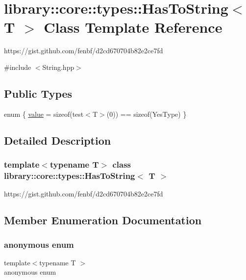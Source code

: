 \hypertarget{classlibrary_1_1core_1_1types_1_1_has_to_string}{}\section{library\+:\+:core\+:\+:types\+:\+:Has\+To\+String$<$ T $>$ Class Template Reference}
\label{classlibrary_1_1core_1_1types_1_1_has_to_string}


https\+://gist.github.\+com/fenbf/d2cd670704b82e2ce7fd  




{\ttfamily \#include $<$String.\+hpp$>$}

\subsection*{Public Types}
\begin{DoxyCompactItemize}
\item 
enum \{ \hyperlink{classlibrary_1_1core_1_1types_1_1_has_to_string_a66718ae4c4783afe3e8137ddbd6689afaec23beac9fd1e1c74d43c6242f649acc}{value} = sizeof(test$<$T$>$(0)) == sizeof(Yes\+Type)
 \}
\end{DoxyCompactItemize}


\subsection{Detailed Description}
\subsubsection*{template$<$typename T$>$\newline
class library\+::core\+::types\+::\+Has\+To\+String$<$ T $>$}

https\+://gist.github.\+com/fenbf/d2cd670704b82e2ce7fd 

\subsection{Member Enumeration Documentation}
\mbox{\label{classlibrary_1_1core_1_1types_1_1_has_to_string_a66718ae4c4783afe3e8137ddbd6689af}} 
\subsubsection{\texorpdfstring{anonymous enum}{anonymous enum}}
{\footnotesize\ttfamily template$<$typename T $>$ \\
anonymous enum}

